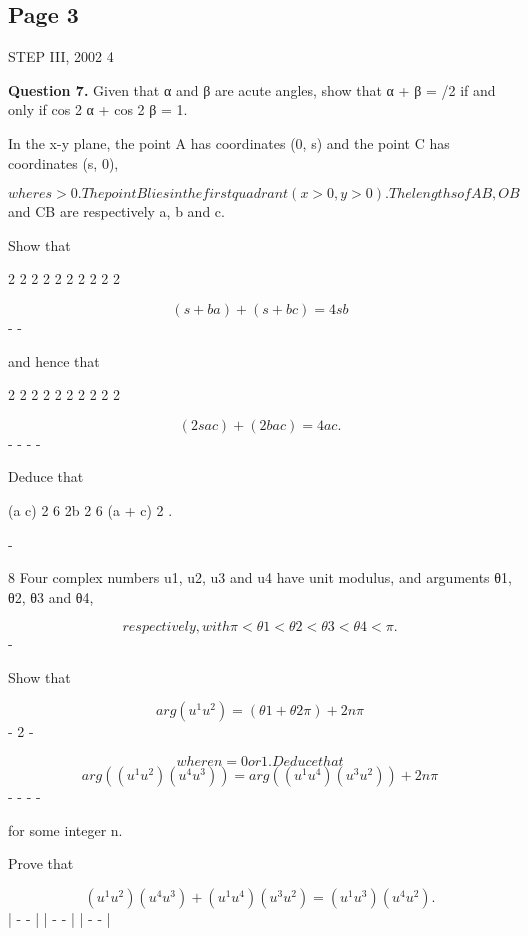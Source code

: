 \documentclass[12pt]{article}
\begin{document}
\subsection*{Page 3}
\begin{flushleft}
STEP III, 2002 4\par
\bigskip\textbf{Question 7.} Given that α and β are acute angles, show that α + β = \pi/2 if and only if cos 2 α + cos 2 β = 1.\par
In the x-y plane, the point A has coordinates (0, s) and the point C has coordinates (s, 0),\par
\[where s > 0. The point B lies in the first quadrant (x > 0, y > 0). The lengths of AB, OB\]
and CB are respectively a, b and c.\par
Show that\par
2 2 2 2 2 2 2 2 2 2\par
\[(s + b a ) + (s + b c ) = 4s b\]
- -\par
and hence that\par
2 2 2 2 2 2 2 2 2 2\par
\[(2s a c ) + (2b a c ) = 4a c .\]
- - - -\par
Deduce that\par
(a c) 2 6 2b 2 6 (a + c) 2 .\par
-\par
8 Four complex numbers u1, u2, u3 and u4 have unit modulus, and arguments θ1, θ2, θ3 and θ4,\par
\[respectively, with \pi < θ1 < θ2 < θ3 < θ4 < \pi.\]
-\par
Show that\par
\[arg (u^1 u^2) = (θ1 + θ2 \pi) + 2n\pi\]
- 2 -\par
\[where n = 0 or 1 . Deduce that\]
\[arg ((u^1 u^2) (u^4 u^3)) = arg ((u^1 u^4) (u^3 u^2)) + 2n\pi\]
- - - -\par
for some integer n.\par
Prove that\par
\[(u^1 u^2) (u^4 u^3) + (u^1 u^4) (u^3 u^2) = (u^1 u^3) (u^4 u^2) .\]
| - - | | - - | | - - |\par
\end{flushleft}
\end{document}
